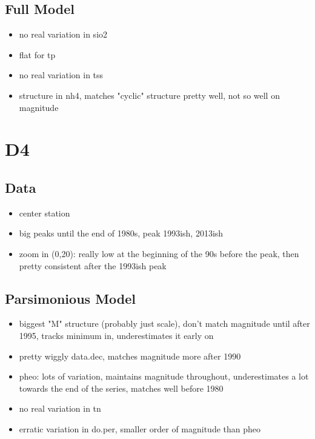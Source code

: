 \documentclass[12pt]{amsart}
\begin{document}
\subsection{Full Model}
\begin{itemize}
\item no real variation in sio2
\item flat for tp
\item no real variation in tss
\item structure in nh4, matches "cyclic" structure pretty well, not so well on magnitude
\end{itemize}

\section{D4}
\subsection{Data}
\begin{itemize}
\item center station
\item big peaks until the end of 1980s, peak 1993ish, 2013ish
\item zoom in (0,20): really low at the beginning of the 90s before the peak, then pretty consistent after the 1993ish peak
\end{itemize}
\subsection{Parsimonious Model}
\begin{itemize}
\item biggest "M" structure (probably just scale), don't match magnitude until after 1995, tracks minimum in, underestimates it early on
\item pretty wiggly data.dec, matches magnitude more after 1990
\item pheo: lots of variation, maintains magnitude throughout, underestimates a lot towards the end of the series, matches well before 1980
\item no real variation in tn
\item erratic variation in do.per, smaller order of magnitude than pheo
\end{itemize}
\end{document}
